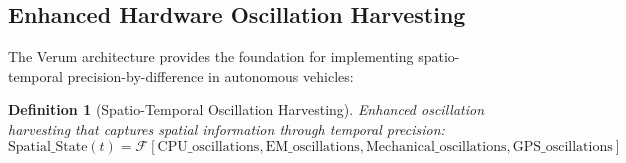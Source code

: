 \documentclass[12pt,a4paper]{article}
\newtheorem{definition}[theorem]{Definition}
\begin{document}
\subsection{Enhanced Hardware Oscillation Harvesting}

The Verum architecture \citep{sachikonye2025autonomous} provides the foundation for implementing spatio-temporal precision-by-difference in autonomous vehicles:

\begin{definition}[Spatio-Temporal Oscillation Harvesting]
Enhanced oscillation harvesting that captures spatial information through temporal precision:
\begin{equation}
\text{Spatial\_State}(t) = \mathcal{F}[\text{CPU\_oscillations}, \text{EM\_oscillations}, \text{Mechanical\_oscillations}, \text{GPS\_oscillations}]
\end{equation}
\end{definition}
\end{document}
